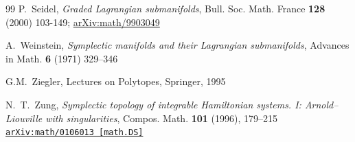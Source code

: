 \documentclass[a4paper,11pt,reqno]{amsart}
\theoremstyle{definition}
\numberwithin{equation}{section}
\begin{document}
\begin{thebibliography}{99}
P.~Seidel,
{\it  Graded Lagrangian submanifolds},
 Bull. Soc. Math. France {\bf 128} (2000) 103-149;
 \href{https://arxiv.org/abs/math/9903049}{arXiv:math/9903049}

A.~Weinstein,
{\it  Symplectic manifolds and their Lagrangian submanifolds},
 Advances in Math. {\bf 6} (1971) 329–346

 G.M.~Ziegler,
 Lectures on Polytopes,
 Springer, 1995

 N.~T.~Zung,
 {\it Symplectic topology of integrable Hamiltonian systems. I: Arnold--Liouville
with singularities}, Compos. Math. {\bf 101} (1996), 179–215
\href{https://arxiv.org/abs/math/0106013}{\tt arXiv:math/0106013 [math.DS]}

\end{thebibliography}
\end{document}
